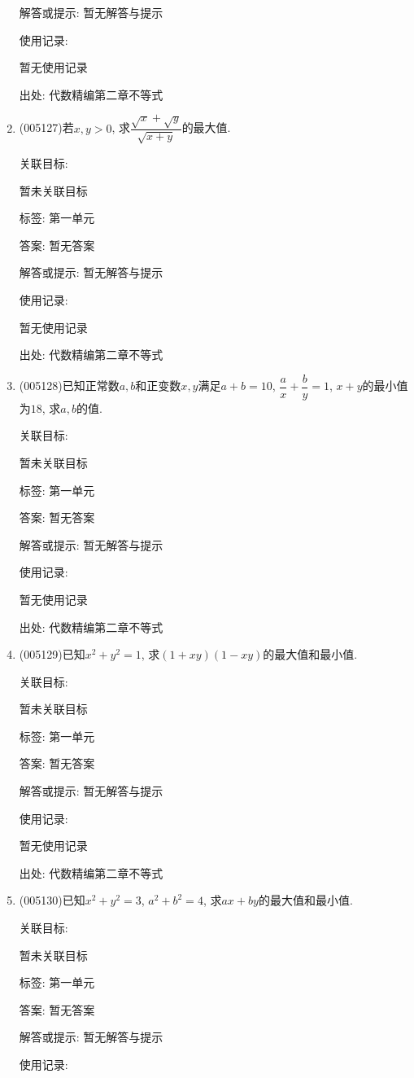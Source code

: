 \documentclass[10pt,a4paper]{article}
\begin{document}
\begin{enumerate}[1.]
解答或提示: 暂无解答与提示

使用记录:

暂无使用记录


出处: 代数精编第二章不等式
\item { (005127)}若$x,y>0$, 求$\dfrac{\sqrt x+\sqrt y}{\sqrt{x+y}}$的最大值.


关联目标:

暂未关联目标



标签: 第一单元

答案: 暂无答案

解答或提示: 暂无解答与提示

使用记录:

暂无使用记录


出处: 代数精编第二章不等式
\item { (005128)}已知正常数$a,b$和正变数$x,y$满足$a+b=10$, $\dfrac ax+\dfrac by=1$, $x+y$的最小值为$18$, 求$a,b$的值.


关联目标:

暂未关联目标



标签: 第一单元

答案: 暂无答案

解答或提示: 暂无解答与提示

使用记录:

暂无使用记录


出处: 代数精编第二章不等式
\item { (005129)}已知$x^2+y^2=1$, 求$(1+xy)(1-xy)$的最大值和最小值.


关联目标:

暂未关联目标



标签: 第一单元

答案: 暂无答案

解答或提示: 暂无解答与提示

使用记录:

暂无使用记录


出处: 代数精编第二章不等式
\item { (005130)}已知$x^2+y^2=3$, $a^2+b^2=4$, 求$ax+by$的最大值和最小值.


关联目标:

暂未关联目标



标签: 第一单元

答案: 暂无答案

解答或提示: 暂无解答与提示

使用记录:


\end{enumerate}
\end{document}
